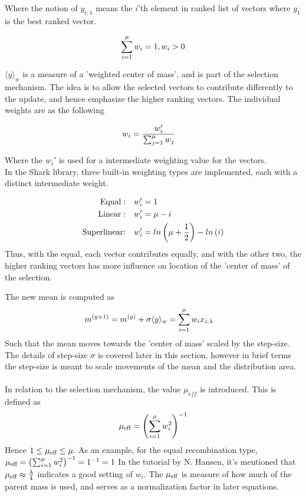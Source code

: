 Where the notion of $y_{i : \lambda}$ means the $i$'th element in ranked list of vectors
where $y_1$ is the best ranked vector.

\begin{align}
\sum^{\mu}_{i = 1} w_{i} = 1, w_{i} > 0
\end{align}

$\langle y \rangle_{w}$ is a measure of a 'weighted center of mass',
and is part of the selection mechanism. The idea is to allow the selected vectors
to contribute differently to the update, and hence emphasize the higher 
ranking vectors. The individual weights are as the following

\begin{align}
w_i &= \frac{w_{i}'}{\sum^{\mu}_{j=1} w_j }
\end{align}

Where the $w_i'$ is used for a intermediate weighting value for the vectors.\\
In the Shark library, three built-in weighting types are implemented, each with
a distinct intermediate weight.

\begin{align}
\text{Equal}: &\quad w_i' = 1 \label{eq:recomType}\\
\text{Linear}: &\quad  w_i' = \mu - i\\
\text{Superlinear:} &\quad w_i' = ln \left( \mu + \frac{1}{2} \right)
- ln \left( i \right)
\end{align}
Thus, with the equal, each vector contributes equally, and with the other two, the 
higher ranking vectors has more influence on location of the 'center of mass' of 
the selection.

The new mean is computed as
\begin{align}
m^{(g+1)} &= m^{(g)} + \sigma \langle y \rangle_{w} = \sum^{\mu}_{i = 1} w_{i}x_{i:\lambda} \label{eq:movemean}
\end{align}
Such that the mean moves towards the 'center of mass' scaled by the step-size.
The details of step-size $\sigma$ is covered later in this section,
however in brief terms the step-size is meant to scale movements 
of the mean and the distribution area.\\
\\
In relation to the selection mechanism, the value $\mu_{eff}$ is introduced.
This is defined as
\begin{align}
\mu_{\text{eff}} = \left( \sum_{i=1}^{\mu} w_i^2 \right)^{-1}
\end{align}
Hence $1 \leq \mu_{\text{eff}} \leq \mu$. As an example, for the equal recombination
type, $\mu_{\text{eff}} = \left( \sum_{i=1}^{\mu} w_i^2 \right)^{-1} = 1^{-1} =1$
In the tutorial by N. Hansen, it's mentioned that $\mu_{\text{eff}} \approx 
\frac{\lambda}{4}$ indicates a good setting of $w_i$. The $\mu_{\text{eff}}$ is 
measure of how much of the parent mass is used, and serves as a normalization 
factor in later equations.\\

